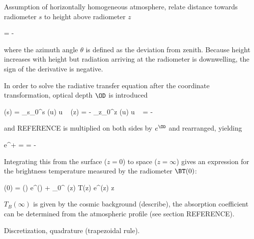         Assumption of horizontally homogeneous atmosphere, relate distance
        towards radiometer $s$ to height above radiometer $z$

        \startformula
             = -  \EQCOMMA
        \stopformula

        where the azimuth angle $\theta$ is defined as the deviation from
        zenith.  Because height increases with height but radiation arriving at
        the radiometer is downwelling, the sign of the derivative is negative.

        In order to solve the radiative transfer equation after the coordinate
        transformation, optical depth $\OD$ is introduced

        \startformula
        \startalign[n=3,align={left,right,left}]
            \NC \NC \OD(s) = \NC \int_{s_0}^{s} \ABSCOEF(u) \diff u \NR
            \NC \Rightarrow~ \NC \OD(z) = \NC
                -  \int_{z_0}^{z} \ABSCOEF(u) \diff u \NR
            \NC \Rightarrow~ \NC {} = \NC
                - \frac{\ABSCOEF}{\cos(\theta)} \EQCOMMA \NR
        \stopalign
        \stopformula

        and REFERENCE is multiplied on both sides by $e^{\OD}$ and
        rearranged, yielding

        \startformula
             e^\OD + 
            = 
            = -  \EQSTOP
        \stopformula

        Integrating this from the surface ($z = 0$) to space ($z = \infty$)
        gives an expression for the brightness temperature measured by the
        radiometer $\BT(0)$:

        \startformula
            \BT(0) = \BT(\infty) e^{\OD(\infty)} + 
                \int_{0}^{\infty} \ABSCOEF(z) T(z) e^{\OD(z)} \diff z \EQSTOP
        \stopformula

        $T_B(\infty)$ is given by the cosmic background (describe), the
        absorption coefficient can be determined from the atmospheric profile
        (see section REFERENCE).

    \stopsubsection

    \startsubsection[title={Numerical Treatment}]

        Discretization, quadrature (trapezoidal rule).

    \stopsubsection

